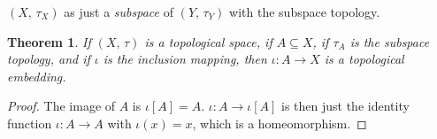 \documentclass{article}
\theoremstyle{plain}
\newtheorem{theorem}{Theorem}[section]
\theoremstyle{normal}
\begin{document}
        $(X,\,\tau_{X})$ as just a \textit{subspace} of $(Y,\,\tau_{Y})$ with
        the subspace topology.
        \begin{theorem}
            If $(X,\,\tau)$ is a topological space, if $A\subseteq{X}$, if
            $\tau_{A}$ is the subspace topology, and if $\iota$ is the
            inclusion mapping, then $\iota:A\rightarrow{X}$ is a topological
            embedding.
        \end{theorem}
        \begin{proof}
            The image of $A$ is $\iota[A]=A$. $\iota:A\rightarrow\iota[A]$ is
            then just the identity function $\iota:A\rightarrow{A}$ with
            $\iota(x)=x$, which is a homeomorphism.
        \end{proof}
\end{document}
